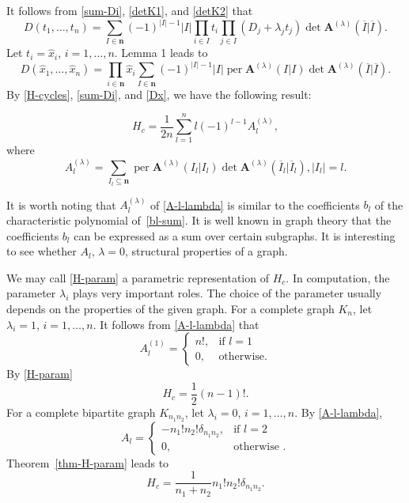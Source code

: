 \documentclass[manuscript, printscheme]{aomart}
\newtheorem[{}\it]{thm}{Theorem}[section]
\theoremstyle{definition}
\newtheorem*[{}\it]{notation}{Notation}
\DeclareMathOperator{\per}{per}
\newcommand{\envert}[1]{\left\lvert#1\right\rvert}
\let\abs=\envert
\begin{document}
It follows from \eqref{sum-Di}, \eqref{detK1}, and \eqref{detK2} that
\begin{equation}\label{Dt}
D(t_1,\dots,t_n)=\sum_{I\in\mathbf{n}}(-1)^{\abs{I}-1}\abs{I}
\prod_{i\in I}t_i\prod_{j\in I}(D_j+\lambda_jt_j)\det\mathbf{A}^{(\lambda)}
(\overline I|\overline I).
\end{equation}
Let $t_i=\hat x_i$, $i=1,\dots,n$. Lemma 1 leads to
\begin{equation}\label{Dx}
D(\hat x_1,\dots,\hat x_n)=\prod_{i\in\mathbf{n}}\hat x_i
\sum_{I\in\mathbf{n}}(-1)^{\abs{I}-1}\abs{I}\per \mathbf{A}
^{(\lambda)}(I|I)\det\mathbf{A}^{(\lambda)}(\overline I|\overline I).
\end{equation}
By \eqref{H-cycles}, \eqref{sum-Di}, and \eqref{Dx},
we have the following result:
\begin{thm}\label{thm-H-param}
\begin{equation}\label{H-param}
H_c=\frac{1}{2n}\sum^n_{l =1}l (-1)^{l -1}A_{l}
^{(\lambda)},
\end{equation}
where
\begin{equation}\label{A-l-lambda}
A^{(\lambda)}_l =\sum_{I_l \subseteq\mathbf{n}}\per \mathbf{A}
^{(\lambda)}(I_l |I_l )\det\mathbf{A}^{(\lambda)}
(\overline I_{l}|\overline I_l ),\abs{I_{l}}=l .
\end{equation}
\end{thm}

It is worth noting that $A_l ^{(\lambda)}$ of \eqref{A-l-lambda} is
similar to the coefficients $b_l $ of the characteristic polynomial
of~\eqref{bl-sum}. It is well known in graph theory that the
coefficients 
$b_l $ can be expressed as a sum over certain subgraphs. It is
interesting to see whether $A_l $, $\lambda=0$, structural properties
of a graph.

We may call \eqref{H-param} a parametric representation of $H_c$. In
computation, the parameter $\lambda_i$ plays very important roles. The
choice of the parameter usually depends on the properties of the given
graph. For a complete graph $K_n$, let $\lambda_i=1$, $i=1,\dots,n$.
It follows from \eqref{A-l-lambda} that
\begin{equation}\label{compl-gr}
A^{(1)}_l =\begin{cases} n!,&\text{if }l =1\\
0,&\text{otherwise}.\end{cases}
\end{equation}
By \eqref{H-param}
\begin{equation}
H_c=\frac 12(n-1)!.
\end{equation}
For a complete bipartite graph $K_{n_1n_2}$, let $\lambda_i=0$, $i=1,\dots,n$.
By \eqref{A-l-lambda},
\begin{equation}
A_l =
\begin{cases} -n_1!n_2!\delta_{n_1n_2},&\text{if }l =2\\
0,&\text{otherwise }.\end{cases}
\label{compl-bip-gr}
\end{equation}
Theorem~\ref{thm-H-param}
leads to
\begin{equation}
H_c=\frac1{n_1+n_2}n_1!n_2!\delta_{n_1n_2}.
\end{equation}
\end{document}
